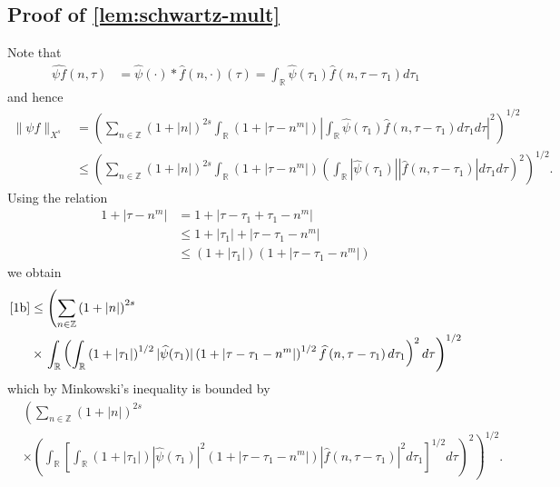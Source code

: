 \documentclass[12pt,reqno]{amsart}
\numberwithin{equation}{section}  %
\numberwithin{figure}{section}
\newcommand{\rr}{\mathbb{R}}
\newcommand{\zz}{\mathbb{Z}}
\newcommand{\wh}{\widehat}
\theoremstyle{plain}
\theoremstyle{definition}
\theoremstyle{remark}
\begin{document}
\subsection{Proof of \autoref{lem:schwartz-mult}}
Note that
%
%
\begin{equation*}
	\begin{split}
		\wh{\psi f}\left( n, \tau \right)
		& = \wh{\psi}(\cdot) * \wh{f}(n,
		\cdot)(\tau)
		= \int_\rr \wh{\psi}(\tau_1) \wh{f} \left( n, \tau - \tau_1 \right) 
		d\tau_1
	\end{split}
\end{equation*}
%
%
and hence
%
%
\begin{equation}
	\label{1b}
	\begin{split}
		\|\psi f\|_{X^s} 
		& = \left( \sum_{n \in \zz} \left (1 + |n| \right )^{2s} \int_\rr \left( 1 + | \tau -
		n^{m} | \right) | \int_\rr \wh{\psi}(\tau_1) \wh{f}\left( n, \tau -
		\tau_1
		\right)  d \tau_1 d \tau |^2 \right)^{1/2}
		\\
		& \le \left( \sum_{n \in \zz} \left (1 + |n| \right )^{2s} \int_\rr \left( 1 + | \tau -
		n^{m }
		|
		\right) \left( \int_\rr |\wh{\psi}\left( \tau_1 \right) | |\wh{f}\left( n,
		\tau - \tau_1
		\right) |  d \tau_1 d \tau \right)^2 \right)^{1/2}.
	\end{split}
\end{equation}
%
%
Using the relation
%
%
\begin{equation*}
	\begin{split}
		1 + | \tau - n^{m } |
    & = 1 + | \tau - \tau_1 + \tau_{1} - n^{m} |
		\\
		& \le 1 + | \tau_1 | + | \tau - \tau_1 - n^{m} |
		\\
		& \le \left( 1 + | \tau_1 | \right)\left( 1 + | \tau - \tau_1 -
		n^{m} | \right)
	\end{split}
\end{equation*}
%
%
we obtain
%
%
\begin{equation*}
	\begin{split}
		\eqref{1b}
		& \le \left( \sum_{n \in \zz} \left (1 + |n| \right )^{2s} \right.
		\\
		& \times \left . \int_\rr \left(
		\int_\rr \left( 1 + | \tau_1 | \right)^{1/2} | \wh{\psi}(\tau_1) |
		\left( 1 + | \tau - \tau_1 - n^{m} | \right)^{1/2} \wh{f}\left( n, \tau
		- \tau_1
		\right)d \tau_1
		\right)^2 d \tau \right)^{1/2}
	\end{split}
\end{equation*}
%
%
which by Minkowski's inequality is bounded by
%
%
\begin{equation}
	\label{2b}
	\begin{split}
		& \left( \sum_{n \in \zz} \left (1 + |n| \right )^{2s}  \right.
		\\
		& \times \left. \left( \int_\rr \left[ \int_\rr
		\left( 1 + | \tau_{1} | \right) | \wh{\psi}(\tau_1) |^2 \left( 1 + |
		\tau - \tau_1 - n^{m} |
		\right) | \wh{f}\left( n, \tau - \tau_1 \right) |^2 d \tau_1 
		\right]^{1/2} d \tau \right)^2 \right)^{1/2}.
	\end{split}
\end{equation}
\end{document}
